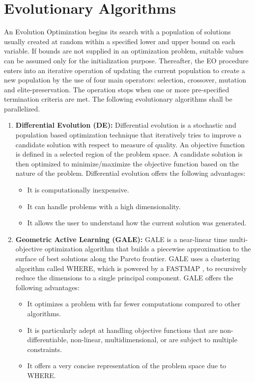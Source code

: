 \documentclass[10pt]{article}
\begin{document}
\section{Evolutionary Algorithms}
\label{algos}

An Evolution Optimization begins its search with a population of solutions usually created at random within a specified lower and upper bound on each variable. If bounds are not supplied in an optimization problem, suitable values can be assumed only for the initialization purpose. Thereafter, the EO procedure enters into an iterative operation of updating the current population to create a new population by the use of four main operators: selection, crossover, mutation and elite-preservation. The operation stops when one or more pre-specified termination criteria are met. The following evolutionary algorithms shall be parallelized.
\begin{enumerate}
\item \textbf{Differential Evolution (DE):} Differential evolution is a stochastic and population based optimization technique that iteratively tries to improve a candidate solution with respect to measure of quality. An objective function is defined in a selected region of the problem space. A candidate solution is then optimized to minimize/maximize the objective function based on the nature of the problem. Differential evolution offers the following advantages:

\begin{itemize}
\item It is computationally inexpensive.
\item It can handle problems with a high dimensionality. 
\item It allows the user to understand how the current solution was generated.
\end{itemize}

\item \textbf{Geometric Active Learning (GALE):} GALE is a near-linear time multi-objective optimization algorithm that builds a piecewise approximation to the surface of best solutions along the Pareto frontier. GALE uses a clustering algorithm called WHERE, which is powered by a FASTMAP \cite{faloutsos95}, to recursively reduce the dimensions to a single principal component. GALE offers the following advantages:

\begin{itemize}
\item It optimizes a problem with far fewer computations compared to other algorithms.
\item It is particularly adept at handling objective functions that are non-differentiable, non-linear, multidimensional, or are subject to multiple constraints.
\item It offers a very concise representation of the problem space due to WHERE.
\end{itemize}
\end{enumerate}
\end{document}
